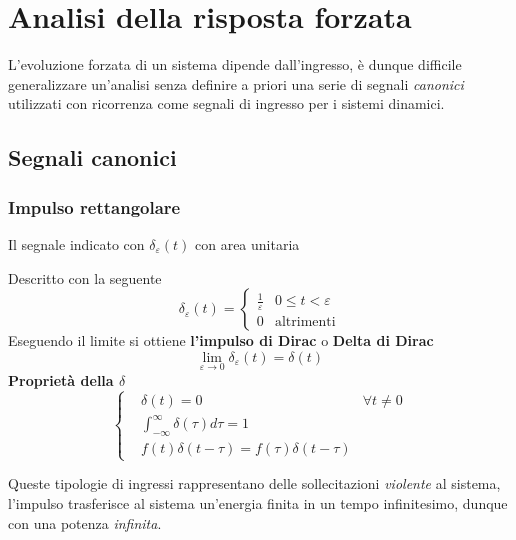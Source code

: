 \newpage
\section{Analisi della risposta forzata}
L'evoluzione forzata di un sistema dipende dall'ingresso, è dunque difficile
generalizzare un'analisi senza definire a priori una serie di segnali
\textit{canonici} utilizzati con ricorrenza come segnali di ingresso per i
sistemi dinamici.

\subsection{Segnali canonici}
\subsubsection{Impulso rettangolare}
Il segnale indicato con $\delta_\varepsilon(t)$ con area unitaria
\begin{figure}[h]
\centering
\end{figure}

Descritto con la seguente
$$
\delta_\varepsilon(t) =
\begin{cases}
\frac{1}{\varepsilon} & 0\leq t <\varepsilon \\
0 & \text{altrimenti}
\end{cases}
$$
Eseguendo il limite si ottiene \textbf{l'impulso di Dirac} o \textbf{Delta di
Dirac}
$$
\lim_{\varepsilon \to 0} \delta_\varepsilon(t) = \delta(t)
$$
\textbf{Proprietà della $\delta$}
$$\left\{
\begin{aligned}
&\delta(t)=0 & \forall t\neq 0 \\
&\int_{-\infty}^{\infty} \delta(\tau)d\tau = 1\\
&f(t)\delta(t-\tau) = f(\tau)\delta(t-\tau)
\end{aligned}\right.
$$

Queste tipologie di ingressi rappresentano delle sollecitazioni
\textit{violente} al sistema, l'impulso trasferisce al sistema un'energia
finita in un tempo infinitesimo, dunque con una potenza \textit{infinita}.

